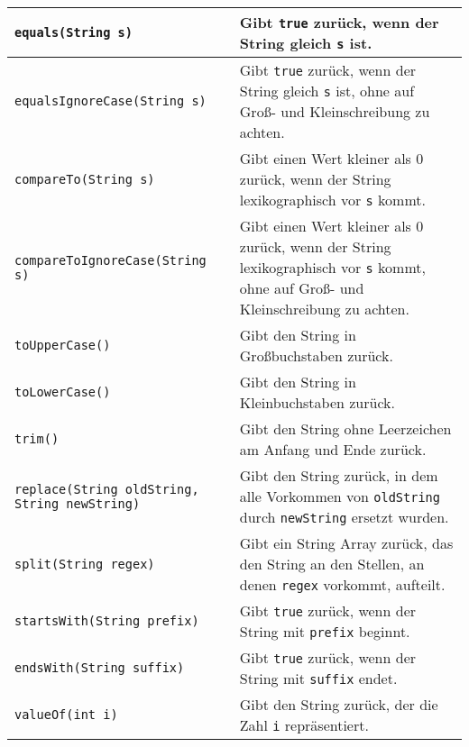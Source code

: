 \documentclass[a4paper, 12pt]{report}
\begin{document}
\begin{tabularx}{\textwidth}{|X|X|}
        \hline
        \texttt{equals(String s)}                            & Gibt \texttt{true} zurück, wenn der String gleich \texttt{s} ist.                                                                         \\
        \hline
        \texttt{equalsIgnoreCase(String s)}                  & Gibt \texttt{true} zurück, wenn der String gleich \texttt{s} ist, ohne auf Groß- und Kleinschreibung zu achten.                           \\
        \hline
        \texttt{compareTo(String s)}                         & Gibt einen Wert kleiner als 0 zurück, wenn der String lexikographisch vor \texttt{s} kommt.                                               \\
        \hline
        \texttt{compareToIgnoreCase(String s)}               & Gibt einen Wert kleiner als 0 zurück, wenn der String lexikographisch vor \texttt{s} kommt, ohne auf Groß- und Kleinschreibung zu achten. \\
        \hline
        \texttt{toUpperCase()}                               & Gibt den String in Großbuchstaben zurück.                                                                                                 \\
        \hline
        \texttt{toLowerCase()}                               & Gibt den String in Kleinbuchstaben zurück.                                                                                                \\
        \hline
        \texttt{trim()}                                      & Gibt den String ohne Leerzeichen am Anfang und Ende zurück.                                                                               \\
        \hline
        \texttt{replace(String oldString, String newString)} & Gibt den String zurück, in dem alle Vorkommen von \texttt{oldString} durch \texttt{newString} ersetzt wurden.                             \\
        \hline
        \texttt{split(String regex)}                         & Gibt ein String Array zurück, das den String an den Stellen, an denen \texttt{regex} vorkommt, aufteilt.                                  \\
        \hline
        \texttt{startsWith(String prefix)}                   & Gibt \texttt{true} zurück, wenn der String mit \texttt{prefix} beginnt.                                                                   \\
        \hline
        \texttt{endsWith(String suffix)}                     & Gibt \texttt{true} zurück, wenn der String mit \texttt{suffix} endet.                                                                     \\
        \hline
        \texttt{valueOf(int i)}                              & Gibt den String zurück, der die Zahl \texttt{i} repräsentiert.                                                                            \\
        \hline
    \end{tabularx}
\end{document}
